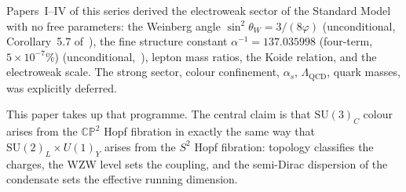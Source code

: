\documentclass[11pt,a4paper]{article}
\theoremstyle{definition}
\theoremstyle{remark}
\newcommand{\vp}{\varphi}
\newcommand{\sinW}{\sin^{2}\!\theta_{W}}
\newcommand{\LQCD}{\Lambda_{\mathrm{QCD}}}
\begin{document}
Papers~I--IV of this series derived the electroweak sector of the
Standard Model with no free parameters: the Weinberg angle
$\sinW=3/(8\vp)$ (unconditional, Corollary~5.7 of~\cite{Paper1}),
the fine structure constant $\alpha^{-1}=137.035998$ (four-term, $5\times10^{-7}\%$)
(unconditional,~\cite{Paper4}), lepton mass ratios, the Koide relation,
and the electroweak scale.  The strong sector,  colour confinement,
$\alpha_s$, $\LQCD$, quark masses,  was explicitly deferred.

This paper takes up that programme.
The central claim is that $\mathrm{SU}(3)_C$ colour arises from the
$\mathbb{CP}^2$ Hopf fibration in exactly the same way that
$\mathrm{SU}(2)_L\times U(1)_Y$ arises from the $S^2$ Hopf fibration:
topology classifies the charges, the WZW level sets the coupling, and
the semi-Dirac dispersion of the condensate sets the effective running
dimension.
\end{document}
